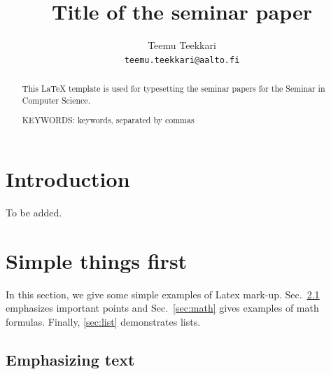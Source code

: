 \documentclass[article]{aaltoseries}
\begin{document}
 

\title{Title of the seminar paper}

\author{Teemu Teekkari%
\\\textnormal{\texttt{teemu.teekkari@aalto.fi}}} %


\maketitle


\begin{abstract}
  This LaTeX template is used for typesetting
  the seminar papers for the Seminar in Computer Science.

\vspace{3mm}
\noindent KEYWORDS: keywords, separated by commas

\end{abstract}




\section{Introduction}

To be added.




\section{Simple things first}

In this section, we give some simple examples of Latex mark-up.
Sec.~\ref{sec:emphasis} emphasizes important points and
Sec.~\ref{sec:math} gives examples of math formulas.
Finally, \ref{sec:list} demonstrates lists.




\subsection{Emphasizing text}
\label{sec:emphasis}
\end{document}
